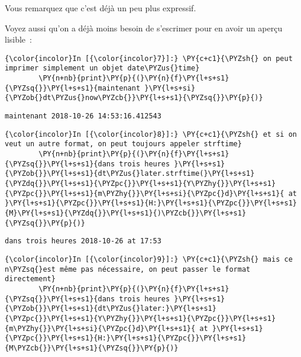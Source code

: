     Vous remarquez que c'est déjà un peu plus expressif.

Voyez aussi qu'on a déjà moins besoin de s'escrimer pour en avoir un
aperçu lisible~:

    \begin{Verbatim}[commandchars=\\\{\}]
{\color{incolor}In [{\color{incolor}7}]:} \PY{c+c1}{\PYZsh{} on peut imprimer simplement un objet date\PYZus{}time}
        \PY{n+nb}{print}\PY{p}{(}\PY{n}{f}\PY{l+s+s1}{\PYZsq{}}\PY{l+s+s1}{maintenant }\PY{l+s+si}{\PYZob{}dt\PYZus{}now\PYZcb{}}\PY{l+s+s1}{\PYZsq{}}\PY{p}{)}
\end{Verbatim}


    \begin{Verbatim}[commandchars=\\\{\}]
maintenant 2018-10-26 14:53:16.412543

    \end{Verbatim}

    \begin{Verbatim}[commandchars=\\\{\}]
{\color{incolor}In [{\color{incolor}8}]:} \PY{c+c1}{\PYZsh{} et si on veut un autre format, on peut toujours appeler strftime}
        \PY{n+nb}{print}\PY{p}{(}\PY{n}{f}\PY{l+s+s1}{\PYZsq{}}\PY{l+s+s1}{dans trois heures }\PY{l+s+s1}{\PYZob{}}\PY{l+s+s1}{dt\PYZus{}later.strftime(}\PY{l+s+s1}{\PYZdq{}}\PY{l+s+s1}{\PYZpc{}}\PY{l+s+s1}{Y\PYZhy{}}\PY{l+s+s1}{\PYZpc{}}\PY{l+s+s1}{m\PYZhy{}}\PY{l+s+si}{\PYZpc{}d}\PY{l+s+s1}{ at }\PY{l+s+s1}{\PYZpc{}}\PY{l+s+s1}{H:}\PY{l+s+s1}{\PYZpc{}}\PY{l+s+s1}{M}\PY{l+s+s1}{\PYZdq{}}\PY{l+s+s1}{)\PYZcb{}}\PY{l+s+s1}{\PYZsq{}}\PY{p}{)}
\end{Verbatim}


    \begin{Verbatim}[commandchars=\\\{\}]
dans trois heures 2018-10-26 at 17:53

    \end{Verbatim}

    \begin{Verbatim}[commandchars=\\\{\}]
{\color{incolor}In [{\color{incolor}9}]:} \PY{c+c1}{\PYZsh{} mais ce n\PYZsq{}est même pas nécessaire, on peut passer le format directement}
        \PY{n+nb}{print}\PY{p}{(}\PY{n}{f}\PY{l+s+s1}{\PYZsq{}}\PY{l+s+s1}{dans trois heures }\PY{l+s+s1}{\PYZob{}}\PY{l+s+s1}{dt\PYZus{}later:}\PY{l+s+s1}{\PYZpc{}}\PY{l+s+s1}{Y\PYZhy{}}\PY{l+s+s1}{\PYZpc{}}\PY{l+s+s1}{m\PYZhy{}}\PY{l+s+si}{\PYZpc{}d}\PY{l+s+s1}{ at }\PY{l+s+s1}{\PYZpc{}}\PY{l+s+s1}{H:}\PY{l+s+s1}{\PYZpc{}}\PY{l+s+s1}{M\PYZcb{}}\PY{l+s+s1}{\PYZsq{}}\PY{p}{)}
\end{Verbatim}


